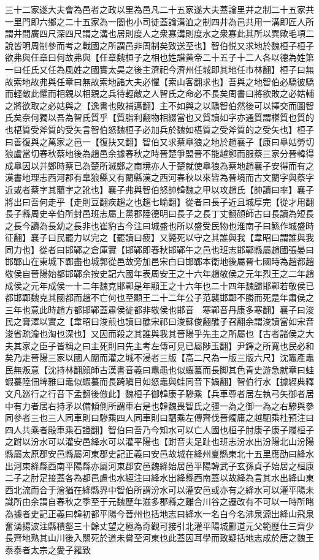 三十二家遂大夫會為邑者之政以里為邑凡二十五家遂大夫蓋論里井之制二十五家共一里門即六鄉之二十五家為一閭也小司徒蓋論溝洫之制四井為邑共用一溝即匠人所謂井間廣四尺深四尺謂之溝也居則度人之衆寡溝則度水之衆寡此其所以異歟毛項二說皆明周制參而考之戰國之所謂邑非周制矣致送至也】智伯悦又求地於魏桓子桓子欲弗與任章曰何故弗與【任章魏桓子之相也姓譜黄帝二十五子十二人各以德為姓第一曰任氏又任為風姓之國實太昊之後主濟祀今濟州任城即其地任市林翻】桓子曰無故索地故弗與任章曰無故索地諸大夫必懼【索山客翻求也】吾與之地智伯必驕彼驕而輕敵此懼而相親以相親之兵待輕敵之人智氏之命必不長矣周書曰將欲敗之必姑輔之將欲取之必姑與之【逸書也敗補邁翻】主不如與之以驕智伯然後可以擇交而圖智氏矣奈何獨以吾為智氏質乎【質脂利翻物相綴當也又質讀如字亦通質謂椹質也質的也椹質受斧質的受矢言智伯怒魏桓子必加兵於魏如椹質之受斧質的之受矢也】桓子曰善復與之萬家之邑一【復扶又翻】智伯又求蔡臯狼之地於趙襄子【康曰臯姑勞切狼盧當切春秋蔡地後為趙邑余據春秋之時晉楚爭盟晉不能越鄭而服蔡三家分晉韓得成臯因以并鄭時蔡已為楚所滅鄭之南境亦人于楚就使臯狼為蔡地趙襄子安得而有之漢書地理志西河郡有臯狼縣又有藺縣漢之西河春秋以來皆為晉境而古文藺字與蔡字近或者蔡字其藺字之訛也】襄子弗與智伯怒帥韓魏之甲以攻趙氏【帥讀曰率】襄子將出曰吾何走乎【走則豆翻疾趨之也趨七喻翻】從者曰長子近且城厚完【從才用翻長子縣周史辛伯所封邑班志屬上黨郡陸德明曰長子之長丁丈翻顔師古曰長讀為短長之長今讀為長幼之長非也崔豹古今注曰城盛也所以盛受民物也淮南子曰鯀作城盛時征翻】襄子曰民罷力以完之【罷讀曰疲】又斃死以守之其誰與我【韋昭曰謂誰與我同力也】從者曰邯鄲之倉庫實【邯鄲即春秋邯鄲午之邑也班志邯鄲縣屬趙國張晏曰邯鄲山在東城下鄲盡也城郭從邑故旁加邑宋白曰邯鄲本衛地後屬晉七國時為趙都趙敬侯自晉陽始都邯鄲余按史記六國年表周安王之十六年趙敬侯之元年烈王之二年趙成侯之元年成侯一十二年魏克邯鄲是年顯王之十六年也二十四年魏歸邯鄲若敬侯已都邯鄲魏克其國都而趙不亡何也至顯王二十二年公子范襲邯鄲不勝而死是年肅侯之三年也意此時趙方都邯鄲蓋肅侯徙都非敬侯也邯音　寒鄲音丹康多寒翻】襄子曰浚民之膏澤以實之【韋昭曰浚煎也讀曰醮宋祁曰浚蘇俊翻醮子召翻余謂浚讀當如宋音浚省疏瀹也淘也深也】又因而殺之其誰與我其晉陽乎先主之所屬也【古者諸侯之大夫其家之臣子皆稱之曰主死則曰先主考左傳可見已屬陟玉翻】尹鐸之所寛也民必和矣乃走晉陽三家以國人闈而灌之城不浸者三版【高二尺為一版三版六尺】沈竈產鼃民無叛意【沈持林翻顔師古漢書音義曰鼃黽也似蝦蟇而長脚其色青史游急就章曰蛙蝦蟇陸佃埤雅曰鼃似蝦蟇而長踦瞋目如怒鼃與蛙同音下媧翻】智伯行水【據經典釋文凡廵行之行音下孟翻後倣此】魏桓子御韓康子驂乘【兵車尊者居左執弓矢御者居中有力者居右持矛以備傾側所謂車右是也韓魏畏智氏之彊一為之御一為之右驂與參同參者三也三人同車則曰驂乘四人同車則曰駟乘左傳齊伐晉燭庸之越駟乘杜預注曰四人共乘者殿車乘石證翻】智伯曰吾乃今知水可以亡人國也桓子肘康子康子履桓子之跗以汾水可以灌安邑絳水可以灌平陽也【跗音夫足趾也班志汾水出汾陽北山汾陽縣屬太原郡安邑縣屬河東郡史記正義曰安邑故城在絳州夏縣東北十五里應劭曰絳水出河東絳縣西南平陽縣亦屬河東郡安邑魏絳始居邑平陽韓武子玄孫貞子始居之桓康二子之肘足接蓋各為都邑慮也水經注曰絳水出絳縣西南蓋以故絳為言其水出絳山東西北流而合于澮猶在絳縣界中智伯所謂汾水可以灌安邑或亦有之絳水可以灌平陽未識所由余謂自春秋之季至于元魏歷年滋多郡縣之離合川谷之遷改有不可以一時所睹為據者史記正義曰韓初都平陽今晉州也括地志曰絳水一名白今名沸泉源出絳山飛泉奮湧揚波注縣積壑三十餘丈望之極為奇觀可接引北灌平陽城酈道元父範歷仕三齊少長齊地熟其山川後入關死於道未嘗至河東也此蓋因耳學而致疑括地志成於唐之魏王泰泰者太宗之愛子羅致